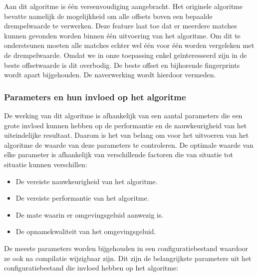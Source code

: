 Aan dit algoritme is één vereenvoudiging aangebracht. Het originele algoritme bevatte namelijk de mogelijkheid om alle offsets boven een bepaalde drempelwaarde te verwerken. Deze feature laat toe dat er meerdere matches kunnen gevonden worden binnen één uitvoering van het algoritme. Om dit te ondersteunen moeten alle matches echter wel één voor één worden vergeleken met de drempelwaarde. Omdat we in onze toepassing enkel geïnteresseerd zijn in de beste offsetwaarde is dit overbodig. De beste offset en bijhorende fingerprints wordt apart bijgehouden. De naverwerking wordt hierdoor vermeden.

\subsubsection{Parameters en hun invloed op het algoritme}

De werking van dit algoritme is afhankelijk van een aantal parameters die een grote invloed kunnen hebben op de performantie en de nauwkeurigheid van het uiteindelijke resultaat. Daarom is het van belang om voor het uitvoeren van het algoritme de waarde van deze parameters te controleren. De optimale waarde van elke parameter is afhankelijk van verschillende factoren die van situatie tot situatie kunnen verschillen:

\begin{itemize}[noitemsep]
\item De vereiste nauwkeurigheid van het algoritme.
\item De vereiste performantie van het algoritme.
\item De mate waarin er omgevingsgeluid aanwezig is.
\item De opnamekwaliteit van het omgevingsgeluid.
\end{itemize}

De meeste parameters worden bijgehouden in een configuratiebestand waardoor ze ook na compilatie wijzigbaar zijn. Dit zijn de belangrijkste parameters uit het configuratiebestand die invloed hebben op het algoritme:

